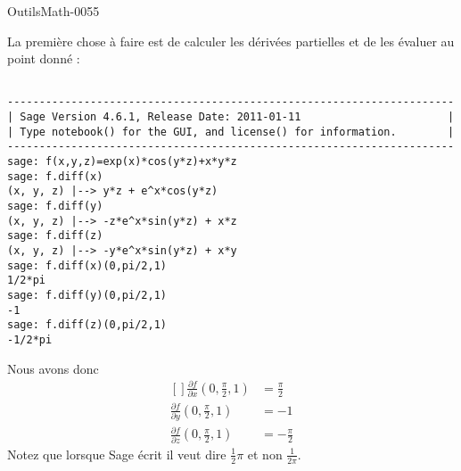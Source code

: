 
\begin{corrige}{OutilsMath-0055}

    La première chose à faire est de calculer les dérivées partielles et de les évaluer au point donné :
    \begin{verbatim}
    
----------------------------------------------------------------------
| Sage Version 4.6.1, Release Date: 2011-01-11                       |
| Type notebook() for the GUI, and license() for information.        |
----------------------------------------------------------------------
sage: f(x,y,z)=exp(x)*cos(y*z)+x*y*z
sage: f.diff(x)
(x, y, z) |--> y*z + e^x*cos(y*z)
sage: f.diff(y)
(x, y, z) |--> -z*e^x*sin(y*z) + x*z
sage: f.diff(z)
(x, y, z) |--> -y*e^x*sin(y*z) + x*y
sage: f.diff(x)(0,pi/2,1)
1/2*pi
sage: f.diff(y)(0,pi/2,1)
-1
sage: f.diff(z)(0,pi/2,1)
-1/2*pi
    \end{verbatim}
    Nous avons donc
    \begin{equation}
        \begin{aligned}[]
            \frac{ \partial f }{ \partial x }(0,\frac{ \pi }{2},1)&=\frac{ \pi }{2}\\
            \frac{ \partial f }{ \partial y }(0,\frac{ \pi }{2},1)&=-1\\
            \frac{ \partial f }{ \partial z }(0,\frac{ \pi }{2},1)&=-\frac{ \pi }{2}
        \end{aligned}
    \end{equation}
    Notez que lorsque Sage écrit  il veut dire $\frac{ 1 }{2}\pi$ et non $\frac{1}{ 2\pi }$.


\end{corrige}
